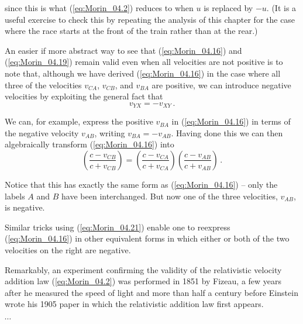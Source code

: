 since this is what (\ref{eq:Morin_04.2}) reduces to when $u$ is replaced by $-u$. (It is a useful exercise to check this by repeating the analysis of this chapter for the case where the race starts at the front of the train rather than at the rear.)

An easier if more abstract way to see that (\ref{eq:Morin_04.16}) and (\ref{eq:Morin_04.19}) remain valid even when all velocities are not positive is to note that, although we have derived (\ref{eq:Morin_04.16}) in the case where all three of the velocities $v_{CA}$, $v_{CB}$, and $v_{BA}$ are positive, we can introduce negative velocities by exploiting the general fact that 
\begin{equation}\label{eq:Morin_04.21}
v_{YX} = -v_{XY}\,.
\end{equation}

We can, for example, express the positive $v_{BA}$ in (\ref{eq:Morin_04.16}) in terms of the negative velocity $v_{AB}$, writing $v_{BA} = - v_{AB}$. Having done this we can then algebraically transform (\ref{eq:Morin_04.16}) into 
\begin{equation}\label{eq:Morin_04.22}
\left( \frac{c - v_{CB}}{c + v_{CB}} \right) = \left( \frac{c - v_{CA}}{c + v_{CA}} \right)  \left( \frac{c - v_{AB}}{c + v_{AB}} \right)\,.
\end{equation}

Notice that this has exactly the same form as (\ref{eq:Morin_04.16}) -- only the labels $A$ and $B$ have been interchanged. But now one of the three velocities, $v_{AB}$, is negative.

Similar tricks using (\ref{eq:Morin_04.21}) enable one to reexpress (\ref{eq:Morin_04.16}) in other equivalent forms in which either or both of the two velocities on the right are negative.

Remarkably, an experiment confirming the validity of the relativistic velocity addition law (\ref{eq:Morin_04.2}) was performed in 1851 by Fizeau, a few years after he measured the speed of light and more than half a century before Einstein wrote his 1905 paper in which the relativistic addition law first appears. 

$\cdots$
 







 





